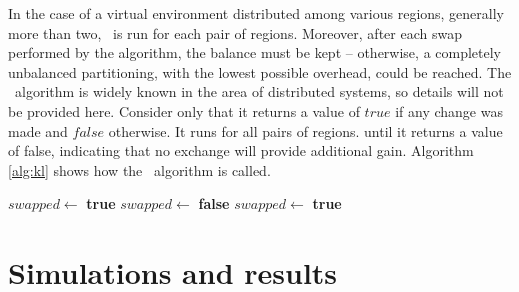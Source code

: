 In the case of a virtual environment distributed among various regions, generally more than two, \kl\ is run for each pair of regions. Moreover, after each swap performed by the algorithm, the balance must be kept -- otherwise, a completely unbalanced partitioning, with the lowest possible overhead, could be reached. The \kl\ algorithm is widely known in the area of distributed systems, so details will not be provided here. Consider only that it returns a value of $true$ if any change was made and $false$ otherwise. It runs for all pairs of regions. until it returns a value of false, indicating that no exchange will provide additional gain. Algorithm \ref{alg:kl} shows how the \kl\ algorithm is called.


\begin{algorithm}
\caption{\kl}
\label{alg:kl}
\begin{algorithmic}[1]

	\STATE $swapped \leftarrow$ \textbf{true}
		\STATE $swapped \leftarrow$ \textbf{false}
					\STATE $swapped \leftarrow$ \textbf{true}
				\ENDIF
			\ENDFOR
		\ENDFOR
	\ENDWHILE

\end{algorithmic}
\end{algorithm}


\section{Simulations and results}
\label{sec:simulations}


